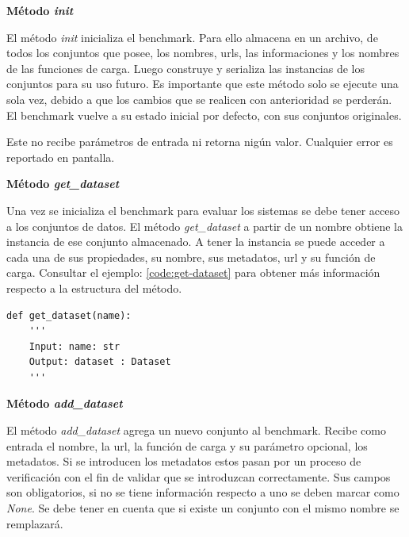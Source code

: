 \begin{flushleft} 
    { \textbf{ Método \textit{init}}}\label{method:create}
\end{flushleft}
El método \textit{init} inicializa el benchmark. Para ello almacena en un archivo, de todos los conjuntos que posee, los nombres, urls, las informaciones y los nombres de las funciones de carga. 
Luego construye y serializa las instancias de los conjuntos para su uso futuro. Es importante que este método solo se ejecute una sola vez, debido a que los cambios 
que se realicen con anterioridad se perderán. El benchmark vuelve a su estado inicial por defecto, con sus conjuntos originales.

Este no recibe parámetros de entrada ni retorna nigún valor. Cualquier error es reportado en pantalla.

\begin{flushleft} 
    { \textbf{Método \textit{get\_dataset}}}\label{method:get-dataset}
\end{flushleft}

Una vez se inicializa el benchmark para evaluar los sistemas se debe tener acceso a los conjuntos de datos.
El método \textit{get\_dataset} a partir de un nombre obtiene la instancia de ese conjunto almacenado.
A tener la instancia se puede acceder a cada una de sus propiedades, su nombre, sus metadatos, url y su 
función de carga.  
Consultar el ejemplo: \ref{code:get-dataset} para obtener más información respecto a la estructura del método. 



\begin{lstlisting}[caption= Método init,label = code:get-dataset]
def get_dataset(name):
    '''
    Input: name: str 
    Output: dataset : Dataset
    ''' 
\end{lstlisting}
  
\begin{flushleft} 
    { \textbf{Método \textit{add\_dataset} }}\label{method:new}
\end{flushleft}
El método \textit{add\_dataset} agrega un nuevo conjunto al benchmark. 
Recibe como entrada el nombre, la url, la función de carga y su parámetro opcional, los metadatos.
Si se introducen los metadatos estos pasan por un proceso de verificación con el fin de validar que se introduzcan correctamente.
Sus campos son obligatorios, si no se tiene información respecto a uno se deben marcar como \textit{None}.
Se debe tener en cuenta que si existe un conjunto con el mismo nombre se remplazará.

